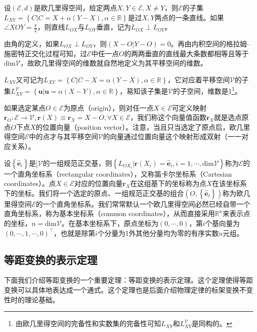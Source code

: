 \documentclass[main.tex]{subfiles}
\begin{document}
\begin{definition}[过两点的直线]
设$\left(\mathcal{E},d\right)$是欧几里得空间，给定两点$X,Y\in\mathcal{E},X\neq Y$，则$\mathcal{E}$的子集$L_{XY}=\left\{C|C=X+\alpha\left(Y-X\right),\alpha\in\mathbb{R}\right\}$是过$X,Y$两点的一条直线。如果$\angle XOY=\frac{\pi}{2}$，则直线$L_{OX}$与$L_{OY}$垂直，记为$L_{OX}\perp L_{OY}$。
\end{definition}

由角的定义，如果$L_{OX}\perp L_{OY}$，则$\left(X-O|Y-O\right)=0$。再由内积空间的格拉姆--施密特正交化过程可知，过$\mathcal{E}$中任一点$O$的两两垂直的直线最大条数都相等且等于$\mathrm{dim}\mathcal{V}$，故欧几里得空间的维数就自然地定义为其平移空间的维数。

$L_{XY}$又可记为$L_{XY}=\left\{C|C-X=\alpha\left(Y-X\right),\alpha\in\mathbb{R}\right\}$，它对应着平移空间$\mathcal{V}$的子集$L^{\mathcal{V}}_{XY}=\left\{\mathbf{u}|\mathbf{u}=\alpha\left(X-Y\right),\alpha\in\mathbb{R}\right\}$，易知该子集是$\mathcal{V}$的子空间，维数是1\footnote{由欧几里得空间的完备性和实数集的完备性可知$L_{XY}$和$L^{\mathcal{V}}_{XY}$是同构的。}。

如果选定某点$O\in\mathcal{E}$为原点（origin），则对任一点$X\in\mathcal{E}$可定义映射$\mathbf{r}_O:\mathcal{E}\rightarrow\mathcal{V},\mathbf{r}\left(X\right)\equiv\mathbf{r}_X=X-O,\forall X\in\mathcal{E}$，我们称这个向量值函数$\mathbf{r}_X$就是选点原点$O$下点$X$的位置向量（position vector）。注意，当且只当选定了原点后，欧几里得空间$\mathcal{E}$中的点才与其平移空间$\mathcal{V}$的向量通过位置向量这个映射形成双射（一一对应关系）。

设$\left\{\mathbf{\hat{e}}_i\right\}$是$]\mathcal{V}$的一组规范正交基，则$\left\{L_{OX_i}|\mathbf{r}\left(X_i\right)=\mathbf{\hat{e}}_i,i=1,\cdots,\mathrm{dim}\mathcal{V}\right\}$称为$\mathcal{E}$的一个直角坐标系（rectangular coordinates），又称笛卡尔坐标系（Cartesian coordinates）。点$X\in\mathcal{E}$对应的位置向量$\mathbf{r}_X$在这组基下的坐标称为点$X$在该坐标系下的坐标。我们将一个选定的原点、一组规范正交基的组合$\left(O,\left\{\mathbf{\hat{e}}_i\right\}\right)$称为欧几里得空间$\mathcal{E}$的一个直角坐标系。我们常常默认一个欧几里得空间必然已经自带一个直角坐标系，称为基本坐标系（common coordinates），从而直接采用$\mathbb{R}^n$来表示点的坐标，$n=\mathrm{dim}\mathcal{V}$。在基本坐标系下，原点坐标为$\left(0,\cdots,0\right)$，第$i$个基向量为$\left(0,\cdots,1,\cdots,0\right)^\intercal$，也就是除第$i$个分量为1外其他分量均为零的有序实数$n$元组。

\subsection{等距变换的表示定理}
下面我们介绍等距变换的一个重要定理：等距变换的表示定理。这个定理使得等距变换可以具体地表达成一个通式。这个定理也是后面介绍物理定律的标架变换不变性时的理论基础。
\end{document}
